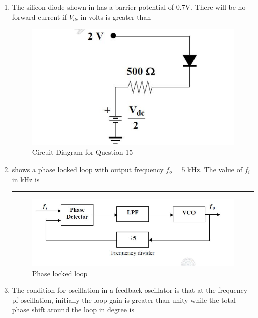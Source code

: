 \documentclass[journal,12pt,onecolumn]{IEEEtran}
\theoremstyle{remark}
\begin{document}
\begin{enumerate}
\item The silicon diode shown in  has a barrier potential of $0.7\text{V}$. There will be no forward current if $V_{dc}$ in volts is greater than \par \hfill{}
\begin{figure}[H]
    \centering
    \includegraphics[width=0.5\columnwidth]{Figs/Q-15.png}
    \caption{Circuit Diagram for Question-15}
    \label{fig:placeholder_7}
\end{figure}
\begin{enumerate}
\end{enumerate}

\item {} shows a phase locked loop with output frequency $f_o = 5$ kHz. The value of $f_i$ in kHz is \rule{1.5cm}{0.4pt}
\par \hfill{}
\begin{figure}[H] 
    \centering
    \includegraphics[width=0.7\columnwidth]{Figs/Q-16.png}
    \caption{Phase locked loop}
    \label{fig:placeholder_8}
\end{figure}

\item The condition for oscillation in a feedback oscillator is that at the frequency pf oscillation, initially the loop gain is greater than unity while the total phase shift around the loop in degree is \par \hfill{}
\begin{enumerate}
\end{enumerate}


\end{enumerate}
\end{document}
